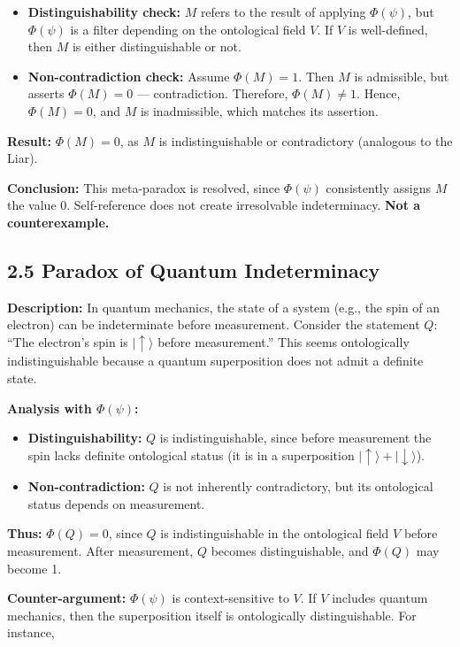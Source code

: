 \documentclass[12pt]{article}
\begin{document}
\begin{itemize}
\item \textbf{Distinguishability check:} $M$ refers to the result of applying $\Phi(\psi)$, but $\Phi(\psi)$ is a filter depending on the ontological field $V$. If $V$ is well-defined, then $M$ is either distinguishable or not.
\item \textbf{Non-contradiction check:}  
Assume $\Phi(M) = 1$. Then $M$ is admissible, but asserts $\Phi(M) = 0$ — contradiction.  
Therefore, $\Phi(M) \neq 1$. Hence, $\Phi(M) = 0$, and $M$ is inadmissible, which matches its assertion.
\end{itemize}

\textbf{Result:} $\Phi(M) = 0$, as $M$ is indistinguishable or contradictory (analogous to the Liar).

\textbf{Conclusion:} This meta-paradox is resolved, since $\Phi(\psi)$ consistently assigns $M$ the value 0. Self-reference does not create irresolvable indeterminacy. \textbf{Not a counterexample.}

\subsection*{2.5 Paradox of Quantum Indeterminacy}

\textbf{Description:}  
In quantum mechanics, the state of a system (e.g., the spin of an electron) can be indeterminate before measurement.  
Consider the statement $Q$: ``The electron’s spin is $|\uparrow\rangle$ before measurement.''  
This seems ontologically indistinguishable because a quantum superposition does not admit a definite state.

\textbf{Analysis with $\Phi(\psi)$:}

\begin{itemize}
\item \textbf{Distinguishability:} $Q$ is indistinguishable, since before measurement the spin lacks definite ontological status (it is in a superposition $|\uparrow\rangle + |\downarrow\rangle$).
\item \textbf{Non-contradiction:} $Q$ is not inherently contradictory, but its ontological status depends on measurement.
\end{itemize}

\textbf{Thus:} $\Phi(Q) = 0$, since $Q$ is indistinguishable in the ontological field $V$ before measurement.  
After measurement, $Q$ becomes distinguishable, and $\Phi(Q)$ may become 1.

\textbf{Counter-argument:} $\Phi(\psi)$ is context-sensitive to $V$. If $V$ includes quantum mechanics, then the superposition itself is ontologically distinguishable. For instance,
\end{document}
